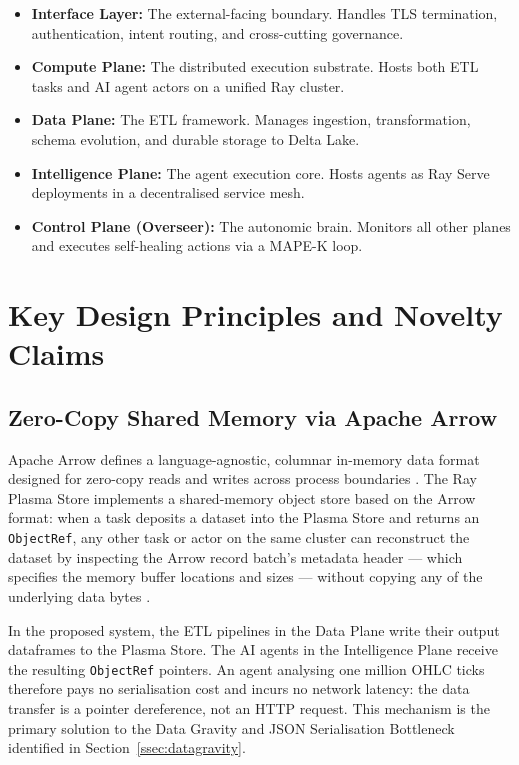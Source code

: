 \documentclass[12pt, a4paper]{report}
\begin{document}
\begin{itemize}
  \item \textbf{Interface Layer:} The external-facing boundary. Handles TLS termination,
  authentication, intent routing, and cross-cutting governance.
  \item \textbf{Compute Plane:} The distributed execution substrate. Hosts both ETL tasks
  and AI agent actors on a unified Ray cluster.
  \item \textbf{Data Plane:} The ETL framework. Manages ingestion, transformation,
  schema evolution, and durable storage to Delta Lake.
  \item \textbf{Intelligence Plane:} The agent execution core. Hosts agents as Ray Serve
  deployments in a decentralised service mesh.
  \item \textbf{Control Plane (Overseer):} The autonomic brain. Monitors all other planes
  and executes self-healing actions via a MAPE-K loop.
\end{itemize}

\section{Key Design Principles and Novelty Claims}
\label{sec:novelty}

\subsection{Zero-Copy Shared Memory via Apache Arrow}
\label{ssec:zerocopy}

Apache Arrow defines a language-agnostic, columnar in-memory data format designed for
zero-copy reads and writes across process boundaries \citep{arrow_github}.
The Ray Plasma Store implements a shared-memory object store based on the Arrow format:
when a task deposits a dataset into the Plasma Store and returns an
\texttt{ObjectRef}, any other task or actor on the same cluster can reconstruct
the dataset by inspecting the Arrow record batch's metadata header — which specifies the
memory buffer locations and sizes — without copying any of the underlying data bytes
\citep{moritz2018ray}.

In the proposed system, the ETL pipelines in the Data Plane write their output dataframes
to the Plasma Store.
The AI agents in the Intelligence Plane receive the resulting \texttt{ObjectRef} pointers.
An agent analysing one million OHLC ticks therefore pays no serialisation cost and
incurs no network latency: the data transfer is a pointer dereference, not an HTTP
request.
This mechanism is the primary solution to the Data Gravity and JSON Serialisation
Bottleneck identified in Section~\ref{ssec:datagravity}.
\end{document}

